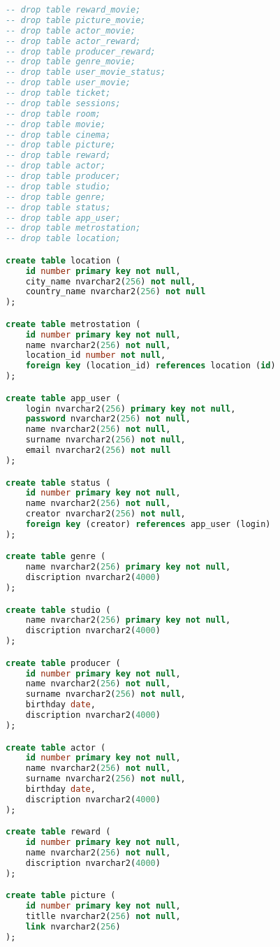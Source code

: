 \documentclass[a4paper,16pt]{article}
\begin{document}
\begin{lstlisting}[language=SQL]
-- drop table reward_movie;
-- drop table picture_movie;
-- drop table actor_movie;
-- drop table actor_reward;
-- drop table producer_reward;
-- drop table genre_movie;
-- drop table user_movie_status;
-- drop table user_movie;
-- drop table ticket;
-- drop table sessions;
-- drop table room;
-- drop table movie;
-- drop table cinema;
-- drop table picture;
-- drop table reward;
-- drop table actor;
-- drop table producer;
-- drop table studio;
-- drop table genre;
-- drop table status;
-- drop table app_user;
-- drop table metrostation;
-- drop table location;

create table location (
    id number primary key not null,
    city_name nvarchar2(256) not null,
    country_name nvarchar2(256) not null
);

create table metrostation (
    id number primary key not null,
    name nvarchar2(256) not null,
    location_id number not null,
    foreign key (location_id) references location (id)
);

create table app_user (
    login nvarchar2(256) primary key not null,
    password nvarchar2(256) not null,
    name nvarchar2(256) not null,
    surname nvarchar2(256) not null,
    email nvarchar2(256) not null
);

create table status (
    id number primary key not null,
    name nvarchar2(256) not null,
    creator nvarchar2(256) not null,
    foreign key (creator) references app_user (login)
);

create table genre (
    name nvarchar2(256) primary key not null,
    discription nvarchar2(4000)
);

create table studio (
    name nvarchar2(256) primary key not null,
    discription nvarchar2(4000)
);

create table producer (
    id number primary key not null,
    name nvarchar2(256) not null,
    surname nvarchar2(256) not null,
    birthday date,
    discription nvarchar2(4000)
);

create table actor (
    id number primary key not null,
    name nvarchar2(256) not null,
    surname nvarchar2(256) not null,
    birthday date,
    discription nvarchar2(4000)
);

create table reward (
    id number primary key not null,
    name nvarchar2(256) not null,
    discription nvarchar2(4000)
);

create table picture (
    id number primary key not null,
    titlle nvarchar2(256) not null,
    link nvarchar2(256)
);


\end{lstlisting}
\end{document}
